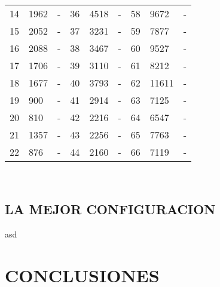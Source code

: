 \begin{table}[htb]
\begin{minipage}{1\textwidth}
\begin{center}
\begin{tabular}{@{}lll|lll|lll@{}}
					14 & 1962 & - & 36 & 4518 & - & 58 & 9672 & -\\
					15 & 2052 & - & 37 & 3231 & - & 59 & 7877 & -\\
					16 & 2088 & - & 38 & 3467 & - & 60 & 9527 & -\\
					17 & 1706 & - & 39 & 3110 & - & 61 & 8212 & -\\
					18 & 1677 & - & 40 & 3793 & - & 62 & 11611 & -\\
					19 & 900 & - & 41 & 2914 & - & 63 & 7125 & -\\
					20 & 810 & - & 42 & 2216 & - & 64 & 6547 & -\\
					21 & 1357 & - & 43 & 2256 & - & 65 & 7763 & -\\
					22 & 876 & - & 44 & 2160 & - & 66 & 7119 & -\\

				\end{tabular} \\				
			\end{center} %
		\end{minipage}
	\end{table}
	
 
\section{LA MEJOR CONFIGURACION}
  
   asd 


\newpage\chapter{CONCLUSIONES} 
    
    
   
    
            
  
    
         
     
     
     
  
      
      	
      
     
      
      
      
      
    
  

    

    
    
    

